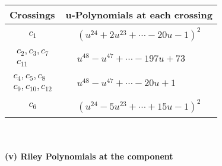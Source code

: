 \documentclass[1p]{elsarticle_modified}
\theoremstyle{definition}
\begin{document}
\begin{tabular}{m{50pt}|m{274pt}}
Crossings & \hspace{64pt}u-Polynomials at each crossing \\
\hline $$\begin{aligned}c_{1}\end{aligned}$$&$\begin{aligned}
&(u^{24}+2 u^{23}+\cdots-20 u-1)^{2}
\end{aligned}$\\
\hline $$\begin{aligned}c_{2},c_{3},c_{7}\\c_{11}\end{aligned}$$&$\begin{aligned}
&u^{48}- u^{47}+\cdots-197 u+73
\end{aligned}$\\
\hline $$\begin{aligned}c_{4},c_{5},c_{8}\\c_{9},c_{10},c_{12}\end{aligned}$$&$\begin{aligned}
&u^{48}- u^{47}+\cdots-20 u+1
\end{aligned}$\\
\hline $$\begin{aligned}c_{6}\end{aligned}$$&$\begin{aligned}
&(u^{24}-5 u^{23}+\cdots+15 u-1)^{2}
\end{aligned}$\\
\hline
\end{tabular}\\~\\
\newpage\renewcommand{\arraystretch}{1}
\flushleft \textbf{(v) Riley Polynomials at the component}\newline \\
\end{document}
